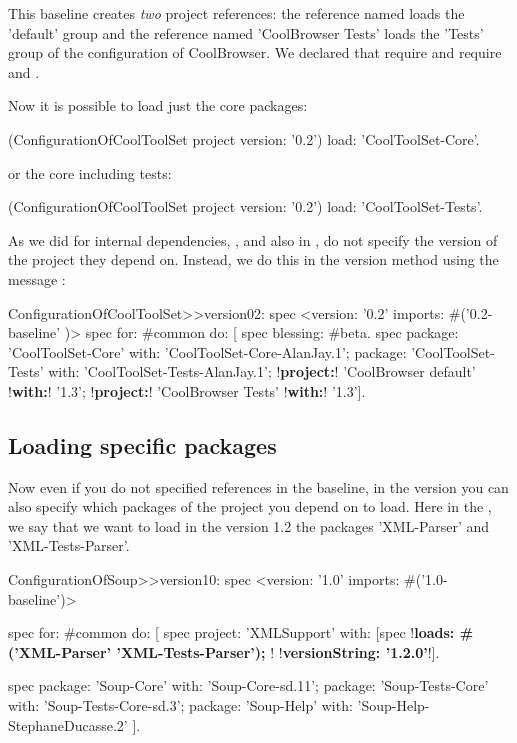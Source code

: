 \documentclass[a4paper,10pt,twoside]{book}
\begin{document}
This baseline creates \emph{two} project references: the reference named  loads the 'default' group and the reference named 'CoolBrowser Tests'  loads the 'Tests' group of the configuration of CoolBrowser. We declared that  require  and  require \mbox{} and .

Now it is possible to load just the core packages:

\begin{code}{}
(ConfigurationOfCoolToolSet project version: '0.2') load: 'CoolToolSet-Core'.
\end{code}

\noindent
or the core including tests:
\begin{code}{}
  (ConfigurationOfCoolToolSet project version: '0.2') load: 'CoolToolSet-Tests'.
\end{code}




As we did for internal dependencies, , and also in , do not specify the version of the project they depend on. Instead, we do this in the version method using the message : 

\begin{code}{}
ConfigurationOfCoolToolSet>>version02: spec 
       <version: '0.2' imports: #('0.2-baseline' )>
       spec for: #common do: [
              spec blessing: #beta.
              spec 
                     package: 'CoolToolSet-Core' with: 'CoolToolSet-Core-AlanJay.1';
                     package: 'CoolToolSet-Tests' with: 'CoolToolSet-Tests-AlanJay.1';
                     !\textbf{project:}! 'CoolBrowser default' !\textbf{with:}! '1.3';
                     !\textbf{project:}! 'CoolBrowser Tests' !\textbf{with:}! '1.3'].
\end{code}

\subsection{Loading specific packages}
Now even if you do not specified references in the baseline, in the version you can also specify which 
packages of the project you depend on to load. Here in the , we say that 
we want to load in the version 1.2 the packages  'XML-Parser' and 'XML-Tests-Parser'.
				
\begin{code}{}
ConfigurationOfSoup>>version10: spec 
	<version: '1.0' imports:  #('1.0-baseline')>
	 
	spec for: #common do: [	
		spec 
			project: 'XMLSupport' 
			with: [spec 
						!\textbf{loads: \#('XML-Parser' 'XML-Tests-Parser'); }!
						!\textbf{versionString: '1.2.0'}!].
	
		spec 
			package: 'Soup-Core' with: 'Soup-Core-sd.11'; 
			package: 'Soup-Tests-Core' with: 'Soup-Tests-Core-sd.3';
			package: 'Soup-Help' with: 'Soup-Help-StephaneDucasse.2' ].
\end{code}
\end{document}
